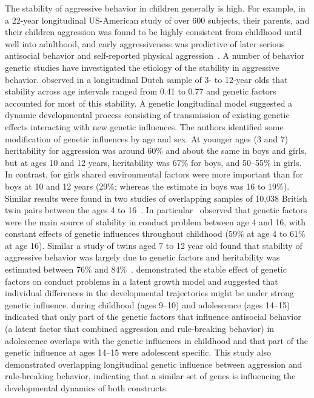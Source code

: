 The stability of aggressive behavior in children generally is high.
For example, in a 22-year longitudinal US-American study of over 600 subjects, their parents, and their children aggression was found to be highly consistent from childhood until well into adulthood, and early aggressiveness was predictive of later serious antisocial behavior and self-reported physical aggression~\cite{Huesmann1984}.
A number of behavior genetic studies have investigated the etiology of the stability in aggressive behavior.
\citet{vanBeijsterveldt2003} observed in a longitudinal Dutch sample of 3- to 12-year olds that stability across age intervals ranged from 0.41 to 0.77 and genetic factors accounted for most of this stability.
A genetic longitudinal model suggested a dynamic developmental process consisting of transmission of existing genetic effects interacting with new genetic influences.
The authors identified some modification of genetic influences by age and sex.
At younger ages (3 and 7) heritability for aggression was around 60\% and about the same in boys and girls, but at ages 10 and 12 years, heritability was 67\% for boys, and 50--55\% in girls.
In contrast, for girls shared environmental factors were more important than for boys at 10 and 12 years (29\%; whereas the estimate in boys was 16 to 19\%).
Similar results were found in two studies of overlapping samples of 10,038 British twin pairs between the ages 4 to 16~\cite{Lewis2015, Pingault2015}.
In particular~\citet{Lewis2015} observed that genetic factors were the main source of stability in conduct problem between age 4 and 16, with constant effects of genetic influences throughout childhood (59\% at age 4 to 61\% at age 16).
Similar a study of twins aged 7 to 12 year old found that stability of aggressive behavior was largely due to genetic factors and heritability was estimated between 76\% and 84\%~\cite{Haberstick2006}.
\citet{Pingault2015} demonstrated the stable effect of genetic factors on conduct problems in a latent growth model and suggested that individual differences in the developmental trajectories might be under strong genetic influence.
\citet{Niv2013} during childhood (ages 9--10) and adolescence (ages 14--15) indicated that only part of the genetic factors that influence antisocial behavior (a latent factor that combined aggression and rule-breaking behavior) in adolescence overlaps with the genetic influences in childhood and that part of the genetic influence at ages 14--15 were adolescent specific.
This study also demonstrated overlapping longitudinal genetic influence between aggression and rule-breaking behavior, indicating that a similar set of genes is influencing the developmental dynamics of both constructs.
